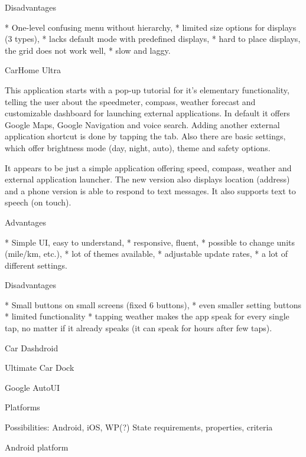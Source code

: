 \seccc Disadvantages

\begitems
* One-level confusing menu without hierarchy,
* limited size options for displays (3 types),
* lacks default mode with predefined displays,
* hard to place displays, the grid does not work well,
* slow and laggy.
\enditems


\secc CarHome Ultra

This application starts with a pop-up tutorial for it's elementary functionality, telling the user about the speedmeter, compass, weather forecast and customizable dashboard for launching external applications. In default it offers Google Maps, Google Navigation and voice search. Adding another external application shortcut is done by tapping the tab. Also there are basic settings, which offer brightness mode (day, night, auto), theme and safety options.

It appears to be just a simple application offering speed, compass, weather and external application launcher. The new version also displays location (address) and a phone version is able to respond to text messages. It also supports text to speech (on touch).

\seccc Advantages

\begitems
* Simple UI, easy to understand,
* responsive, fluent,
* possible to change units (mile/km, etc.),
* lot of themes available,
* adjustable update rates,
* a lot of different settings.
\enditems

\seccc Disadvantages

\begitems
* Small buttons on small screens (fixed 6 buttons),
* even smaller setting buttons
* limited functionality
* tapping weather makes the app speak for every single tap, no matter if it already speaks (it can speak for hours after few taps).
\enditems

\secc Car Dashdroid

\secc Ultimate Car Dock

\secc Google AutoUI


\sec Platforms

Possibilities: Android, iOS, WP(?)
State requirements, properties, criteria

\sec Android platform


